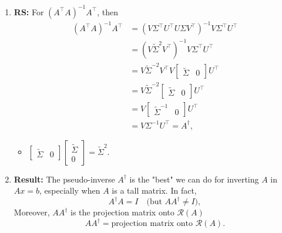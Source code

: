 \begin{intuition}
\begin{enumerate}
        \item \textbf{RS:} For \( (A^\top A)^{-1} A^\top \), then
        \begin{align*}
            (A^\top A)^{-1} A^\top 
            &= \left(V \Sigma^\top U^\top U \Sigma V^\top \right)^{-1} V \Sigma^\top U^\top \\
            &= \left(V \tilde{\Sigma}^2 V^\top \right)^{-1} V \Sigma^\top U^\top \\
            &= V \tilde{\Sigma}^{-2} V^\top V 
            \begin{bmatrix}
            \tilde{\Sigma} & 0
            \end{bmatrix}
            U^\top \\
            &= V \tilde{\Sigma}^{-2} 
            \begin{bmatrix}
            \tilde{\Sigma} & 0
            \end{bmatrix}
            U^\top \\
            &= V 
            \begin{bmatrix}
            \tilde{\Sigma}^{-1} & 0
            \end{bmatrix}
            U^\top \\
            &= V \Sigma^{-1} U^\top = A^\dagger,
        \end{align*}
        \begin{itemize}
            \item $
                    \begin{bmatrix}
                    \tilde{\Sigma} & 0
                    \end{bmatrix}
                    \begin{bmatrix}
                    \tilde{\Sigma} \\
                    0
                    \end{bmatrix}
                    =
                    \tilde{\Sigma}^2.$
        \end{itemize}
        
        \item \textbf{Result:} The pseudo-inverse \(A^\dagger\) is the "best" we can do for inverting \(A\) in \(A x = b\), especially when \(A\) is a tall matrix. In fact,
        \[
        A^\dagger A = I \quad \text{(but } A A^\dagger \neq I\text{)},
        \]
        Moreover, $AA^\dagger$ is the projection matrix onto $\mathcal{R}(A)$
        \[
        A A^\dagger = \text{projection matrix onto } \mathcal{R}(A).
        \]


\end{enumerate}
\end{intuition}
